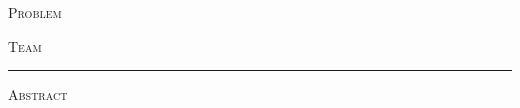 \begin{titlepage}
\thispagestyle{empty}
\vspace*{0.6cm}
\noindent
\begin{minipage}[t]{0.45\textwidth}
  \raggedright
  {\scshape Problem}\\[0.35em]{\LARGE\bfseries\problemltr}
\end{minipage}\hfill
\begin{minipage}[t]{0.45\textwidth}
  \raggedleft
  {\scshape Team}\\[0.35em]{\LARGE\bfseries\teamnum}
\end{minipage}\par

\vspace{1.1em}
\noindent\rule{\textwidth}{0.6pt}\par
\vspace{1.7em}

{\centering
  {\LARGE\bfseries{}\papertitle\par}
  \vspace{1.5em}
  {\large\scshape Abstract}\par
}
\vspace{0.9em}


\end{titlepage}
